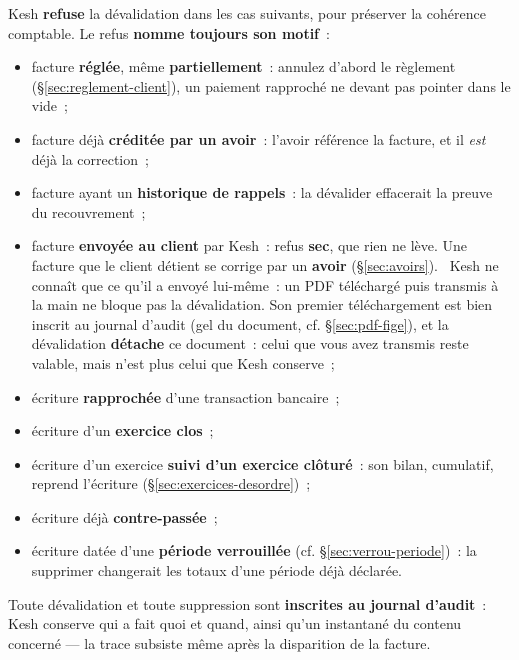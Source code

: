 \documentclass[a4paper,11pt,oneside]{article}
\begin{document}
Kesh \textbf{refuse} la dévalidation dans les cas suivants, pour préserver la cohérence comptable.
Le refus \textbf{nomme toujours son motif}~:

\begin{itemize}
    \item facture \textbf{réglée}, même \textbf{partiellement}~: annulez d'abord le règlement
          (\S\ref{sec:reglement-client}), un paiement rapproché ne devant pas pointer dans le
          vide~;
    \item facture déjà \textbf{créditée par un avoir}~: l'avoir référence la facture, et il
          \emph{est} déjà la correction~;
    \item facture ayant un \textbf{historique de rappels}~: la dévalider effacerait la preuve du
          recouvrement~;
    \item facture \textbf{envoyée au client} par Kesh~: refus \textbf{sec}, que rien ne lève. Une
          facture que le client détient se corrige par un \textbf{avoir} (\S\ref{sec:avoirs}).
          \keshAttention\ Kesh ne connaît que ce qu'il a envoyé lui-même~: un PDF téléchargé puis transmis à la
          main ne bloque pas la dévalidation. Son premier téléchargement est bien inscrit au
          journal d'audit (gel du document, cf. \S\ref{sec:pdf-fige}), et la dévalidation
          \textbf{détache} ce document~: celui que vous avez transmis reste valable, mais n'est plus
          celui que Kesh conserve~;
    \item écriture \textbf{rapprochée} d'une transaction bancaire~;
    \item écriture d'un \textbf{exercice clos}~;
    \item écriture d'un exercice \textbf{suivi d'un exercice clôturé}~: son bilan, cumulatif,
          reprend l'écriture (\S\ref{sec:exercices-desordre})~;
    \item écriture déjà \textbf{contre-passée}~;
    \item écriture datée d'une \textbf{période verrouillée} (cf. \S\ref{sec:verrou-periode})~: la
          supprimer changerait les totaux d'une période déjà déclarée.
\end{itemize}

\begin{keshnote}
Toute dévalidation et toute suppression sont \textbf{inscrites au journal d'audit}~: Kesh
conserve qui a fait quoi et quand, ainsi qu'un instantané du contenu concerné --- la trace subsiste
même après la disparition de la facture.
\end{keshnote}
\end{document}
